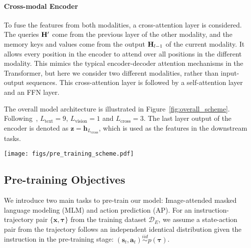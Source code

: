 \documentclass[10pt,twocolumn,letterpaper]{article}
\newcommand{\Hmat}{{\bf H}}
\newcommand{\av}{{\boldsymbol{a}}}
\newcommand{\hv}[0]{{\boldsymbol{h}}}
\newcommand{\sv}{{\boldsymbol{s}}}
\newcommand{\xv}{\boldsymbol{x}}
\newcommand{\zv}{\boldsymbol{z}}
\newcommand{\tauv}[0]{{\boldsymbol{\tau}}}
\newcommand{\Dcal}{\mathcal{D}}
\begin{document}
\paragraph{Cross-modal Encoder} To fuse the features from both modalities, a cross-attention layer is considered. The queries $\Hmat'$ come from the previous layer of the other modality, and the memory keys and values come from the output $\Hmat_{l-1}$ of the current modality. It allows every position in the encoder to attend over all positions in the different modality. This mimics the typical encoder-decoder attention mechanisms in the Transformer, but here we consider two different modalities, rather than input-output sequences. This cross-attention layer is followed by a self-attention layer and an FFN layer. 

The overall model architecture is illustrated in Figure~\ref{fig:overall_scheme}. Following~\cite{tan2019lxmert}, $L_{\text{text}} = 9$,  $L_{\text{vision}} = 1$ and $L_{\text{cross}} = 3$. The last layer output of the encoder is denoted as $\zv = \hv_{L_{\text{cross}}}$, which is used as the features in the downstream tasks.


\begin{figure*}[t!]\vspace{-0mm}\centering
	\texttt{[image: figs/pre\_training\_scheme.pdf]}  
	\vspace{-0mm}
	\caption{Illustration of the proposed pre-training model. In this example, two learning objectives are considered: ($i$) image-attended masked language modeling is performed on the masked word $\mathtt{right}$ in the instruction; ($ii$) action prediction is performed to make the decision to navigate toward direction $\mathtt{180}$. Only the language features are used for fine-tuning in downstream tasks.}
	\vspace{-4mm}
	\label{fig:overall_scheme}
\end{figure*}



\subsection{Pre-training Objectives}

We introduce two main tasks to pre-train our model: Image-attended masked language modeling (MLM) and action prediction (AP). For an instruction-trajectory pair $\{\xv, \tauv\}$ from the training dataset $\Dcal_E$, we assume a state-action pair from the trajectory follows an independent identical distribution given the instruction in the pre-training stage: $ (\sv_t, \av_t) \overset{iid}{\sim} p(\tauv)$.
\end{document}
